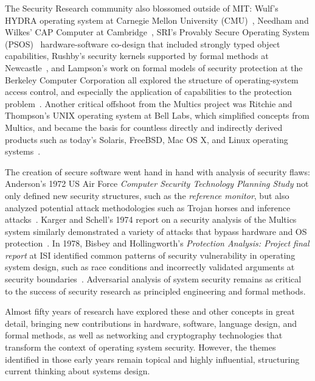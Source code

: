 The Security Research community also blossomed outside of MIT:
Wulf's HYDRA operating system at Carnegie Mellon University (CMU)~\cite{wulf:hydra,CohenJefferson75},
Needham and Wilkes' CAP Computer at
Cambridge~\cite{WilkesNeedham79}, SRI's Provably Secure Operating
System (PSOS)~\cite{PSOSreport,PSOS} hardware-software co-design that included
strongly typed object capabilities,
Rushby's security kernels supported by formal
methods at Newcastle~\cite{Rushby81}, and Lampson's work on
formal models of security
protection at the Berkeley Computer
Corporation all explored the structure of operating-system access control, and
especially the application of capabilities to the protection
problem~\cite{lampson:dynamicprotection,lampson:protection}.
Another critical offshoot from the Multics project was Ritchie and Thompson's UNIX
operating system at Bell Labs, which simplified concepts
from Multics, and became the basis for countless directly and indirectly derived
products such as today's Solaris, FreeBSD, Mac OS X, and Linux operating
systems~\cite{ritchie:unix}.

The creation of secure software went hand in hand with analysis of security flaws:
Anderson's 1972 US Air Force {\em Computer Security Technology Planning
Study} not
only defined new security structures, such as the {\em reference monitor}, but
also analyzed potential attack methodologies such as Trojan horses and
inference attacks~\cite{anderson72}.
Karger and Schell's 1974 report on a security analysis of the Multics system
similarly demonstrated a variety of attacks that bypass hardware and OS
protection~\cite{KargerSchell74}.
In 1978, Bisbey and Hollingworth's {\em Protection Analysis: Project final report} at ISI
identified common patterns of security vulnerability in operating
system design, such as race conditions and incorrectly validated arguments at security
boundaries~\cite{Bisbey78}.
Adversarial analysis of system security remains as critical to the success of security
research as principled engineering and formal methods.

Almost fifty years of research have explored these and other
concepts in great detail, bringing new contributions in hardware, software, language
design, and formal methods, as well as networking and cryptography technologies that
transform the context of operating system security.
However, the themes identified in those early years remain topical and highly influential,
structuring current thinking about systems design.

